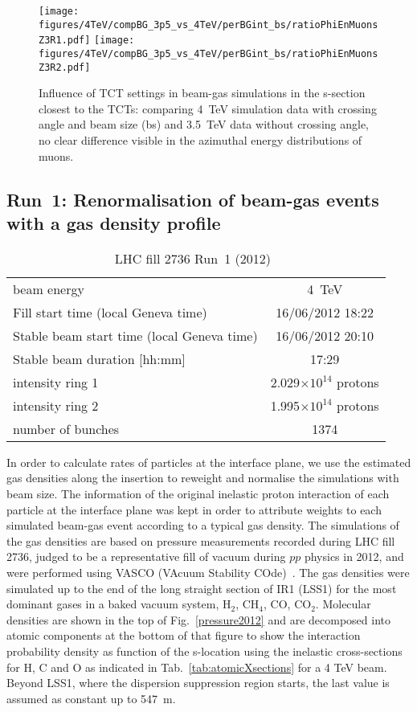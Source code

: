 \begin{figure}
  \centering
  \texttt{[image: figures/4TeV/compBG\_3p5\_vs\_4TeV/perBGint\_bs/ratioPhiEnMuonsZ3R1.pdf]}
  \texttt{[image: figures/4TeV/compBG\_3p5\_vs\_4TeV/perBGint\_bs/ratioPhiEnMuonsZ3R2.pdf]}
  \caption{Influence of TCT settings in beam-gas simulations in the s-section closest to the TCTs: comparing 4~TeV simulation data with crossing angle and beam size (bs) and 3.5~TeV data without crossing angle, no clear difference visible in the azimuthal energy distributions of muons.
  \label{compBGrun1}}
\end{figure}

\subsection{Run~1: Renormalisation of beam-gas events with a gas density profile \label{BGreweighted4TeV}}

\begin{table}
   \centering
   \caption{LHC fill 2736 Run~1 (2012)~\cite{refAccStats}}
   \begin{tabular}{l||c}
       \hline
       beam energy  & 4~TeV \\
       Fill start time (local Geneva time) & 16/06/2012 18:22\\
       Stable beam start time (local Geneva time) & 16/06/2012 20:10\\
       Stable beam duration [hh:mm] & 17:29\\
       intensity ring 1& 2.029$\times 10^{14}$ protons\\
       intensity ring 2& 1.995$\times 10^{14}$ protons\\
       number of bunches & 1374 \\
       \hline
   \end{tabular}
   \label{tab:fillRunI}
\end{table}
In order to calculate rates of particles at the interface plane, we use the estimated gas densities along the insertion to reweight and normalise the simulations with beam size.
The information of the original inelastic proton interaction of each particle at the interface plane was kept in order to attribute weights to each simulated beam-gas event according to a typical gas density. The simulations of the gas densities are based on pressure measurements recorded during LHC fill 2736, judged to be a representative fill of vacuum during $pp$ physics in 2012, and were performed using VASCO (VAcuum Stability COde)~\cite{vascoRef}. The gas densities were simulated up to the end of the long straight section of IR1 (LSS1) for the most dominant gases in a baked vacuum system, H$_2$, CH$_4$, CO, CO$_2$. Molecular densities are shown in the top of Fig.~\ref{pressure2012} and are decomposed into atomic components at the bottom of that figure to show the interaction probability density as function of the s-location using the inelastic cross-sections for H, C and O as indicated in Tab.~\ref{tab:atomicXsections} for a 4 TeV beam. Beyond LSS1, where the dispersion suppression region starts, the last value is assumed as constant up to 547~m.

